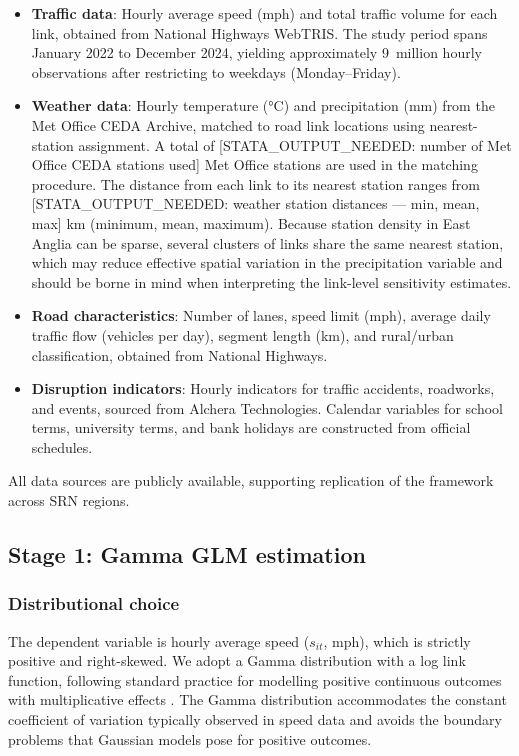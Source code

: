 \documentclass[review]{elsarticle}
\begin{document}
\begin{itemize}
    \item \textbf{Traffic data}: Hourly average speed (mph) and total traffic volume for each link, obtained from National Highways WebTRIS. The study period spans January 2022 to December 2024, yielding approximately 9~million hourly observations after restricting to weekdays (Monday--Friday).
    \item \textbf{Weather data}: Hourly temperature (\si{\degreeCelsius}) and precipitation (\si{mm}) from the Met Office CEDA Archive, matched to road link locations using nearest-station assignment. A total of [STATA\_OUTPUT\_NEEDED: number of Met Office CEDA stations used] Met Office stations are used in the matching procedure. The distance from each link to its nearest station ranges from [STATA\_OUTPUT\_NEEDED: weather station distances --- min, mean, max] km (minimum, mean, maximum). Because station density in East Anglia can be sparse, several clusters of links share the same nearest station, which may reduce effective spatial variation in the precipitation variable and should be borne in mind when interpreting the link-level sensitivity estimates.
    \item \textbf{Road characteristics}: Number of lanes, speed limit (\si{mph}), average daily traffic flow (vehicles per day), segment length (\si{km}), and rural/urban classification, obtained from National Highways.
    \item \textbf{Disruption indicators}: Hourly indicators for traffic accidents, roadworks, and events, sourced from Alchera Technologies. Calendar variables for school terms, university terms, and bank holidays are constructed from official schedules.
\end{itemize}

All data sources are publicly available, supporting replication of the framework across SRN regions.


\subsection{Stage 1: Gamma GLM estimation}
\label{sec:method:glm}

\subsubsection{Distributional choice}

The dependent variable is hourly average speed ($s_{it}$, mph), which is strictly positive and right-skewed. We adopt a Gamma distribution with a log link function, following standard practice for modelling positive continuous outcomes with multiplicative effects \citep{mccullagh1989glm,nelder1972glm}. The Gamma distribution accommodates the constant coefficient of variation typically observed in speed data and avoids the boundary problems that Gaussian models pose for positive outcomes.
\end{document}
